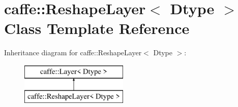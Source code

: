 \hypertarget{classcaffe_1_1ReshapeLayer}{}\section{caffe\+:\+:Reshape\+Layer$<$ Dtype $>$ Class Template Reference}
\label{classcaffe_1_1ReshapeLayer}
Inheritance diagram for caffe\+:\+:Reshape\+Layer$<$ Dtype $>$\+:\begin{figure}[H]
\begin{center}
\leavevmode
\includegraphics[height=2.000000cm]{classcaffe_1_1ReshapeLayer}
\end{center}
\end{figure}
